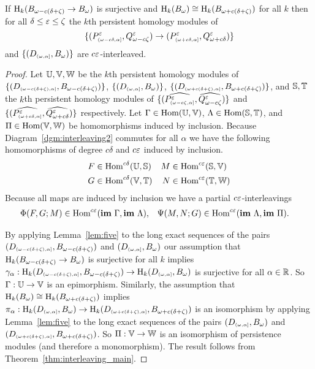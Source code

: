 \begin{lemma}\label{lem:pt_interleaving}
  If $\hom_k(\b\to\B)$ is surjective and $\hom_k(\B)\cong \hom_k(\BB)$ for all $k$ then for all $\delta\leq\e\leq\zeta$ the $k$th persistent homology modules of \[\{(P^\e\subi{\omega-c\of,\alpha},\Q^\e)\to(P^\e\subi{\omega+c\of,\alpha},\QQ^\e)\}\] and $\{(D\subi{\omega,\alpha}, \B)\}$ are $c\e$-interleaved.
\end{lemma}
\begin{proof}
  Let $\U, \V, \W$ be the $k$th persistent homology modules of $\{(D\subi{\omega-c(\delta+\zeta), \alpha}, \b)\}$, $\{(D\subi{\omega,\alpha}, \B)\}$, $\{(D\subi{\omega+c(\delta+\zeta),\alpha}, \BB)\}$, and $\S, \T$ the $k$th persistent homology modules of $\{(\ext{P^\e\subi{\omega-c\zeta,\alpha}},\ext{\Q^\e})\}$ and $\{(\ext{P^\e\subi{\omega+c\of,\alpha}},\ext{\QQ^\e})\}$ respectively.
  Let $\Gamma\in\Hom(\U,\V)$, $\Lambda\in\Hom(\S, \T)$, and $\Pi\in\Hom(\V,\W)$ be homomorphisms induced by inclusion.
  Because Diagram~\ref{dgm:interleaving2} commutes for all $\alpha$ we have the following homomorphisms of degree $c\delta$ and $c\e$ induced by inclusion.
  \begin{align*}
    F&\in\Hom^{c\delta}(\U,\S)& M&\in\Hom^{c\e}(\S,\V)\\
    G&\in\Hom^{c\delta}(\V,\T)& N&\in\Hom^{c\e}(\T,\W)
  \end{align*}
  Because all maps are induced by inclusion we have a partial $c\e$-interleavings
  \begin{align*}
    \Phi(F, G; M)&\in\Hom^{c\e}(\im~\Gamma, \im~\Lambda), & \Psi(M, N; G)&\in\Hom^{c\e}(\im~\Lambda, \im~\Pi).
  \end{align*}

  By applying Lemma~\ref{lem:five} to the long exact sequences of the pairs $(D\subi{\omega-c(\delta+\zeta),\alpha},\b)$ and $(D\subi{\omega,\alpha},\B)$ our assumption that $\hom_k(\b\to\B)$ is surjective for all $k$ implies $\gamma_\alpha : \hom_k(D\subi{\omega-c(\delta+\zeta),\alpha},\b)\to \hom_k(D\subi{\omega,\alpha},\B)$ is surjective for all $\alpha\in\R$.
  So $\Gamma : \U\to \V$ is an epimorphism.
  Similarly, the assumption that $\hom_k(\B)\cong \hom_k(\BB)$ implies $\pi_\alpha : \hom_k(D\subi{\omega,\alpha},\B)\to \hom_k(D\subi{\omega+c(\delta+\zeta),\alpha},\BB)$ is an isomorphism by applying Lemma~\ref{lem:five} to the long exact sequences of the pairs $(D\subi{\omega,\alpha},\B)$ and $(D\subi{\omega+c(\delta+\zeta),\alpha},\BB)$.
  So $\Pi : \V\to\W$ is an isomorphism of persistence modules (and therefore a monomorphism).
  The result follows from Theorem~\ref{thm:interleaving_main}.



\end{proof}
